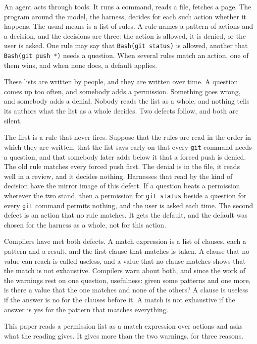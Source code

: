 \documentclass[acmsmall,nonacm,screen]{acmart}
\newcommand{\tool}[2]{\texttt{#1(#2)}}
\newcommand{\rest}{\textup{\texttt{*}}}
\begin{document}
An agent acts through tools. It runs a command, reads a file, fetches a page. The program
around the model, the harness, decides for each such action whether it happens. The usual
means is a list of rules. A rule names a pattern of actions and a decision, and the decisions
are three: the action is allowed, it is denied, or the user is asked. One rule may say that
\tool{Bash}{git status} is allowed, another that \tool{Bash}{git push \rest} needs a
question. When several rules match an action, one of them wins, and when none does, a default
applies.

These lists are written by people, and they are written over time. A question comes up too
often, and somebody adds a permission. Something goes wrong, and somebody adds a denial.
Nobody reads the list as a whole, and nothing tells its authors what the list as a whole
decides. Two defects follow, and both are silent.

The first is a rule that never fires. Suppose that the rules are read in the order in which
they are written, that the list says early on that every \texttt{git} command needs a
question, and that somebody later adds below it that a forced push is denied. The old rule
matches every forced push first. The denial is in the file, it reads well in a review, and it
decides nothing. Harnesses that read by the kind of decision have the mirror image of this
defect. If a question beats a permission wherever the two stand, then a permission for
\texttt{git status} beside a question for every \texttt{git} command permits nothing, and the
user is asked each time. The second defect is an action that no rule matches. It gets the
default, and the default was chosen for the harness as a whole, not for this action.

Compilers have met both defects. A match expression is a list of clauses, each a pattern and
a result, and the first clause that matches is taken. A clause that no value can reach is
called useless, and a value that no clause matches shows that the match is not exhaustive.
Compilers warn about both, and since the work of \citet{Maranget2007} the warnings rest on
one question, usefulness: given some patterns and one more, is there a value that the one
matches and none of the others? A clause is useless if the answer is no for the clauses
before it. A match is not exhaustive if the answer is yes for the pattern that matches
everything.

This paper reads a permission list as a match expression over actions and asks what the
reading gives. It gives more than the two warnings, for three reasons.
\end{document}
